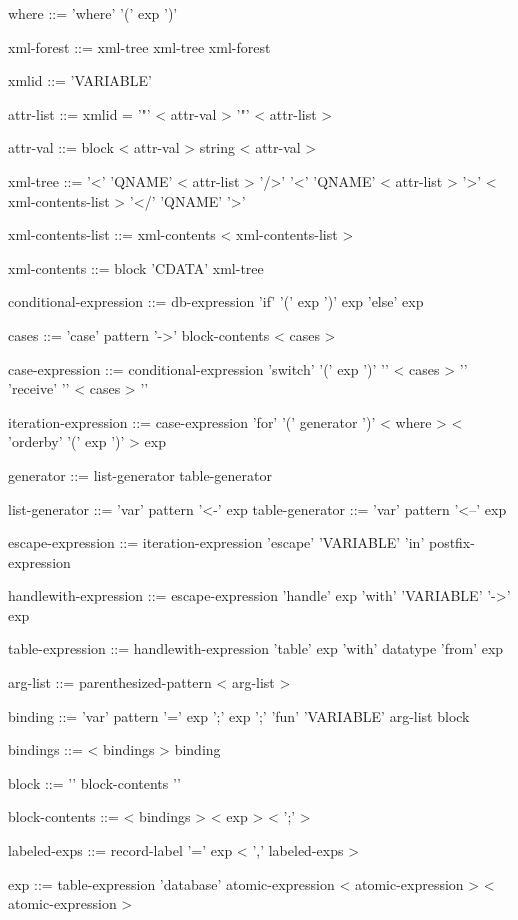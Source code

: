 \documentclass[11pt,a4paper]{article}
\begin{document}
\begin{grammar}
where ::= 'where' '(' exp ')'

xml-forest ::= xml-tree
               xml-tree xml-forest

xmlid ::= 'VARIABLE'

attr-list ::= xmlid = '"' < attr-val > '"' < attr-list > 

attr-val ::= block < attr-val >
             string < attr-val > 

xml-tree ::= '<' 'QNAME' < attr-list > '/>'
             '<' 'QNAME' < attr-list > '>' < xml-contents-list > '</' 'QNAME' '>'

xml-contents-list ::= xml-contents < xml-contents-list >

xml-contents ::= block
                 'CDATA'
                 xml-tree

conditional-expression ::= db-expression
                           'if' '(' exp ')' exp 'else' exp

cases ::= 'case' pattern '->' block-contents < cases > 

case-expression ::=  conditional-expression
                     'switch' '(' exp ')' '{' < cases > '}'
                     'receive' '{' < cases > '}'

iteration-expression ::= case-expression
                         'for' '(' generator ')' < where > < 'orderby' '(' exp ')' > exp

generator ::=  list-generator
               table-generator

list-generator  ::= 'var' pattern '<-' exp
table-generator ::= 'var' pattern '<--' exp

escape-expression ::= iteration-expression
                      'escape' 'VARIABLE' 'in' postfix-expression

handlewith-expression ::= escape-expression
                          'handle' exp 'with' 'VARIABLE' '->' exp

table-expression ::=  handlewith-expression
                      'table' exp 'with' datatype 'from' exp

arg-list ::= parenthesized-pattern < arg-list > 

binding ::= 'var' pattern '=' exp ';'
            exp ';'
            'fun' 'VARIABLE' arg-list block

bindings ::= < bindings > binding

block ::= '{' block-contents '}'

block-contents ::= < bindings > < exp > < ';' > 

labeled-exps ::= record-label '=' exp < ',' labeled-exps >

exp ::= table-expression
        'database' atomic-expression < atomic-expression > < atomic-expression > 
\end{grammar}
\end{document}
